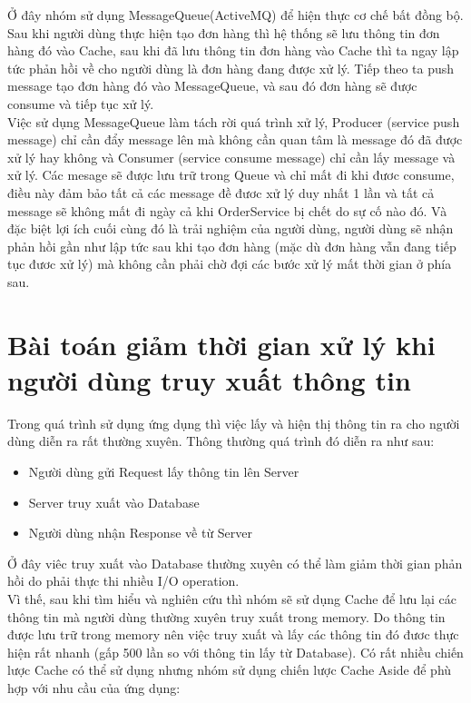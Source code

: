         Ở đây nhóm sử dụng MessageQueue(ActiveMQ) để hiện thực cơ chế bất đồng bộ. Sau khi người dùng thực hiện tạo đơn hàng thì hệ thống sẽ lưu thông tin đơn hàng đó vào Cache, sau khi đã lưu thông tin đơn hàng vào Cache thì ta ngay lập tức phản hồi về cho người dùng là đơn hàng đang được xử lý. Tiếp theo ta push message tạo đơn hàng đó vào MessageQueue, và sau đó đơn hàng sẽ được consume và tiếp tục xử lý.\\
        
        Việc sử dụng MessageQueue làm tách rời quá trình xử lý, Producer (service push message) chỉ cần đẩy message lên mà không cần quan tâm là message đó đã được xử lý hay không và Consumer (service consume message) chỉ cần lấy message và xử lý. Các mesage sẽ được lưu trữ trong Queue và chỉ mất đi khi đươc consume, điều này đảm bảo tất cả các message đề đươc xử lý duy nhất 1 lần và tất cả message sẽ không mất đi ngày cả khi OrderService bị chết do sự cố nào đó. Và đặc biệt lợi ích cuối cùng đó là trải nghiệm của người dùng, người dùng sẽ nhận phản hồi gần như lập tức sau khi tạo đơn hàng (mặc dù đơn hàng vẫn đang tiếp tục đươc xử lý) mà không cần phải chờ đợi các bước xử lý mất thời gian ở phía sau. 
	
		\section{Bài toán giảm thời gian xử lý khi người dùng truy xuất thông tin}
		    Trong quá trình sử dụng ứng dụng thì việc lấy và hiện thị thông tin ra cho người dùng diễn ra rất thường xuyên. Thông thường quá trình đó diễn ra như sau:
		    \begin{itemize}
                \item Người dùng gửi Request lấy thông tin lên Server
                \item Server truy xuất vào Database
                \item Người dùng nhận Response về từ Server 
            \end{itemize}
            
            
            Ở đây viêc truy xuất vào Database thường xuyên có thể làm giảm thời gian phản hồi do phải thực thi nhiều I/O operation. \\
            
            Vì thế, sau khi tìm hiểu và nghiên cứu thì nhóm sẽ sử dụng Cache để lưu lại các thông tin mà người dùng thường xuyên truy xuất trong memory. Do thông tin được lưu trữ trong memory nên việc truy xuất và lấy các thông tin đó đươc thực hiện rất nhanh (gấp 500 lần so với thông tin lấy từ Database). Có rất nhiều chiến lược Cache có thể sử dụng nhưng nhóm sử dụng chiến lược Cache Aside để phù hợp với nhu cầu của ứng dụng:
            
